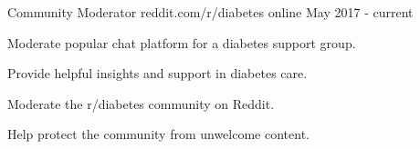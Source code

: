 

\begin{cventries}
  
  
  \cventry
  {Community Moderator} %
  {reddit.com/r/diabetes} %
  {online} %
  {May 2017 - current} %
  {
  \begin{cvitems} %
    \item {Moderate popular chat platform for a diabetes support group.}
    \item {Provide helpful insights and support in diabetes care.}
    \item {Moderate the r/diabetes community on Reddit.}
    \item {Help protect the community from unwelcome content.}
  \end{cvitems}
  }
  

\end{cventries}

